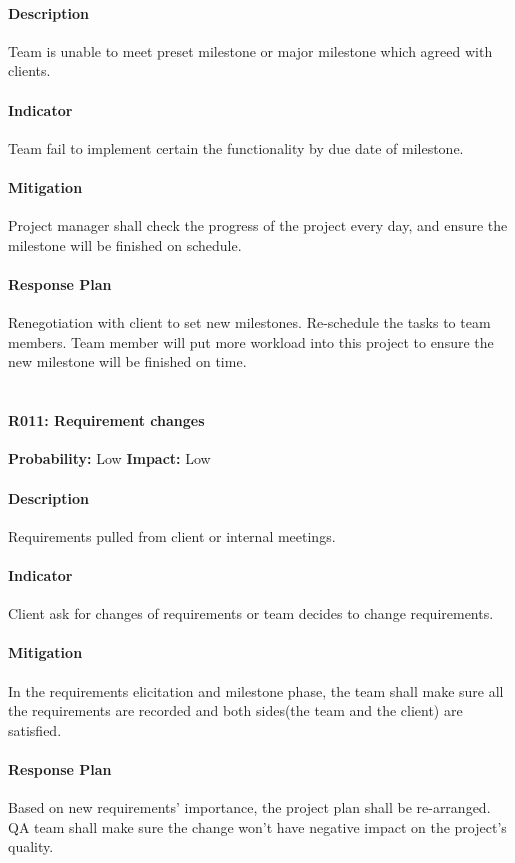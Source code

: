 \documentclass[11pt, a4paper]{report}
\begin{document}
	\paragraph{Description}Team is unable to meet preset milestone or major milestone which agreed with clients.
	\paragraph{Indicator}Team fail to implement certain the functionality by due date of milestone. 
	\paragraph{Mitigation}Project manager shall check the progress of the project every day, and ensure the milestone will be finished on schedule. 
	\paragraph{Response Plan}Renegotiation with client to set new milestones. Re-schedule the tasks to team members. Team member will put more workload into this project to ensure the new milestone will be finished on time.\\\\

\pagebreak

	\paragraph{R011: Requirement changes} \hspace{1cm} \textbf{Probability: }Low\hspace{1cm}   \textbf{Impact: }Low
	\paragraph{Description}Requirements pulled from client or internal meetings.
	\paragraph{Indicator}Client ask for changes of requirements or team decides to change requirements.  
	\paragraph{Mitigation}In the requirements elicitation and milestone phase, the team shall make sure all the requirements are recorded and both sides(the team and the client) are satisfied.
	\paragraph{Response Plan}Based on new requirements' importance, the project plan shall be re-arranged. QA team shall make sure the change won't have negative impact on the project's quality. \\\\
\end{document}
